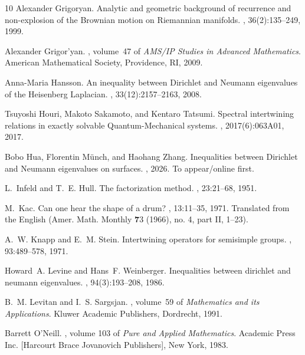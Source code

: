 \documentclass{amsart}
\theoremstyle{definition}
\theoremstyle{remark}
\numberwithin{equation}{section}
\begin{document}
\begin{thebibliography}{10}
Alexander Grigor{\cprime}yan.
\newblock Analytic and geometric background of recurrence and non-explosion of the {B}rownian motion on {R}iemannian manifolds.
, 36(2):135--249, 1999.

Alexander Grigor'yan.
, volume~47 of {\em AMS/IP Studies in Advanced Mathematics}.
\newblock American Mathematical Society, Providence, RI, 2009.

Anna-Maria Hansson.
\newblock An inequality between {D}irichlet and {N}eumann eigenvalues of the {H}eisenberg {L}aplacian.
, 33(12):2157--2163, 2008.

Tsuyoshi Houri, Makoto Sakamoto, and Kentaro Tatsumi.
\newblock Spectral intertwining relations in exactly solvable Quantum-Mechanical systems.
, 2017(6):063A01, 2017.

Bobo Hua, Florentin M{\"u}nch, and Haohang Zhang.
\newblock Inequalities between {D}irichlet and {N}eumann eigenvalues on surfaces.
, 2026.
\newblock To appear/online first.

L.~Infeld and T.~E. Hull.
\newblock The factorization method.
, 23:21--68, 1951.

M.~Kac.
\newblock Can one hear the shape of a drum?
, 13:11--35, 1971.
\newblock Translated from the English (Amer. Math. Monthly {{\bf{7}}3} (1966), no. 4, part II, 1--23).

A.~W. Knapp and E.~M. Stein.
\newblock Intertwining operators for semisimple groups.
, 93:489--578, 1971.

Howard~A. Levine and Hans~F. Weinberger.
\newblock Inequalities between dirichlet and neumann eigenvalues.
, 94(3):193--208, 1986.

B.~M. Levitan and I.~S. Sargsjan.
, volume~59 of {\em Mathematics and its Applications}.
\newblock Kluwer Academic Publishers, Dordrecht, 1991.

Barrett O'Neill.
, volume 103 of {\em Pure and Applied Mathematics}.
\newblock Academic Press Inc. [Harcourt Brace Jovanovich Publishers], New York, 1983.


\end{thebibliography}
\end{document}
